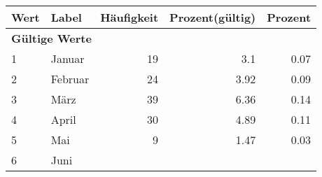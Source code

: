      \begin{longtable}{lXrrr}
     \toprule
     \textbf{Wert} & \textbf{Label} & \textbf{Häufigkeit} & \textbf{Prozent(gültig)} & \textbf{Prozent} \\
     \endhead
     \midrule
     \multicolumn{5}{l}{\textbf{Gültige Werte}}\\

     1 &
     \multicolumn{1}{X}{ Januar   } &


       \num{19} &
       \num[round-mode=places,round-precision=2]{3,1} &
         \num[round-mode=places,round-precision=2]{0,07} \\

     2 &
     \multicolumn{1}{X}{ Februar   } &


       \num{24} &
       \num[round-mode=places,round-precision=2]{3,92} &
         \num[round-mode=places,round-precision=2]{0,09} \\

     3 &
     \multicolumn{1}{X}{ März   } &


       \num{39} &
       \num[round-mode=places,round-precision=2]{6,36} &
         \num[round-mode=places,round-precision=2]{0,14} \\

     4 &
     \multicolumn{1}{X}{ April   } &


       \num{30} &
       \num[round-mode=places,round-precision=2]{4,89} &
         \num[round-mode=places,round-precision=2]{0,11} \\

     5 &
     \multicolumn{1}{X}{ Mai   } &


       \num{9} &
       \num[round-mode=places,round-precision=2]{1,47} &
         \num[round-mode=places,round-precision=2]{0,03} \\

     6 &
     \multicolumn{1}{X}{ Juni   } &



\end{longtable}
